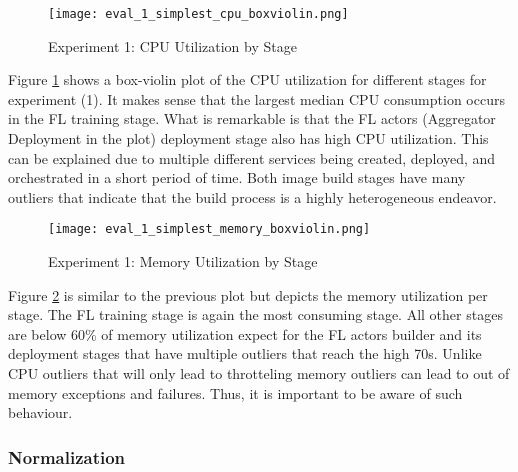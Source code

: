 \begin{figure}[p]
    \begin{adjustwidth}{-0.2\paperwidth}{-0.2\paperwidth}
        \centering
        \texttt{[image: eval\_1\_simplest\_cpu\_boxviolin.png]}
        \caption{Experiment 1: CPU Utilization by Stage}
        \label{fig:eval_1_simplest_cpu_boxviolin}
    \end{adjustwidth}
\end{figure}

Figure \ref{fig:eval_1_simplest_cpu_boxviolin} shows a box-violin plot of the CPU utilization for different stages for experiment (1).
It makes sense that the largest median CPU consumption occurs in the FL training stage.
What is remarkable is that the FL actors (Aggregator Deployment in the plot) deployment stage also has high CPU utilization.
This can be explained due to multiple different services being created, deployed, and orchestrated in a short period of time.
Both image build stages have many outliers that indicate that the build process is a highly heterogeneous endeavor.

\begin{figure}[p]
    \begin{adjustwidth}{-0.2\paperwidth}{-0.2\paperwidth}
        \centering
        \texttt{[image: eval\_1\_simplest\_memory\_boxviolin.png]}
        \caption{Experiment 1: Memory Utilization by Stage}
        \label{fig:eval_1_simplest_memory_boxviolin}
    \end{adjustwidth}
\end{figure}

Figure \ref{fig:eval_1_simplest_memory_boxviolin} is similar to the previous plot but depicts the memory utilization per stage.
The FL training stage is again the most consuming stage.
All other stages are below 60\% of memory utilization expect for the FL actors builder and its deployment stages that have multiple outliers that reach the high 70s.
Unlike CPU outliers that will only lead to throtteling memory outliers can lead to out of memory exceptions and failures.
Thus, it is important to be aware of such behaviour.

\subsubsection{Normalization}

